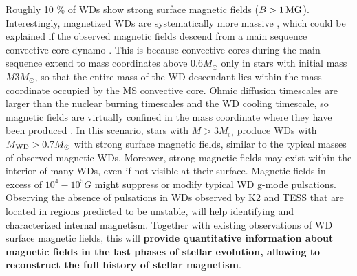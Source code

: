
Roughly 10 \% of WDs show strong surface magnetic fields ($B > 1 \, {\rm MG}$).
Interestingly, magnetized WDs are systematically more massive \cite{Ferrario_2015}, which could be explained if the observed magnetic fields descend from a main sequence convective core dynamo \cite{Cantiello_2016}. This is because convective cores during the main sequence extend to mass coordinates above 0.6$M_\odot$ only in stars with initial mass $M 3M_\odot$, so that the entire mass of the WD descendant lies within the mass coordinate occupied by the MS convective core. Ohmic diffusion timescales are larger than the nuclear burning timescales and the WD cooling timescale, so magnetic fields are virtually confined in the mass coordinate where they have been produced \cite{Cantiello_2016}. In this scenario, stars with $M>3M_\odot$ produce WDs with $M_{\rm WD}>0.7M_\odot$ with strong surface magnetic fields, similar to the typical masses of observed magnetic WDs. Moreover, strong magnetic fields may exist within the interior of many WDs, even if not visible at their surface. Magnetic fields in excess of $10^4-10^5 G$ might suppress or modify typical WD g-mode pulsations. Observing the absence of pulsations in WDs observed by K2 and TESS that are located in regions predicted to be unstable, will help identifying and characterized internal magnetism. Together with existing observations of WD surface magnetic fields, this will \textbf{provide quantitative information about magnetic fields in the last phases of stellar evolution, allowing to reconstruct the full history of stellar magnetism}.